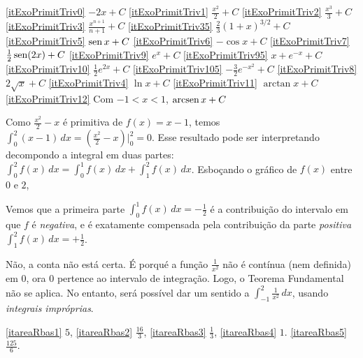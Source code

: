 \begin{Solution}{9.6}
\eqref{itExoPrimitTriv0} $-2x+C$
\eqref{itExoPrimitTriv1} $\frac{x^2}{2}+C$
\eqref{itExoPrimitTriv2} $\frac{x^3}{3}+C$
\eqref{itExoPrimitTriv3} $\frac{x^{n+1}}{n+1}+C$
\eqref{itExoPrimitTriv35} $\tfrac{2}{3}(1+x)^{3/2}+C$
\eqref{itExoPrimitTriv5} $\operatorname{sen} x+C$
\eqref{itExoPrimitTriv6} $-\cos x+C$
\eqref{itExoPrimitTriv7} $\frac{1}{2}\operatorname{sen} (2x)+C$
\eqref{itExoPrimitTriv9} $e^x+C$
\eqref{itExoPrimitTriv95} $x+e^{-x}+C$
\eqref{itExoPrimitTriv10} $\tfrac12 e^{2x}+C$
\eqref{itExoPrimitTriv105} $-\tfrac32e^{-x^2}+C$
\eqref{itExoPrimitTriv8} $2\sqrt{x}+C$
\eqref{itExoPrimitTriv4} $\ln x+C$
\eqref{itExoPrimitTriv11} $\arctan x+C$
\eqref{itExoPrimitTriv12} Com $-1<x<1$, $\operatorname{arcsen} x+C$
\end{Solution}
\begin{Solution}{9.8}
Como $\tfrac{x^2}{2}-x$ é primitiva de $f(x)=x-1$, temos
$\int_0^2(x-1)\,dx=(\tfrac{x^2}{2}-x)|_0^2=0$.
Esse resultado pode ser interpretando decompondo a integral em duas partes:
$\int_0^2f(x)\,dx=\int_0^1f(x)\,dx+\int_1^2f(x)\,dx$.
Esboçando o gráfico de $f(x)$ entre $0$ e $2$,
\begin{center}
\begin{bmlimage}\end{bmlimage}
\end{center}
Vemos que a primeira parte
$\int_0^1f(x)\,dx=-\tfrac12$ é a contribuição do intervalo em
que $f$ é \emph{negativa}, e é exatamente
compensada pela contribuição da parte \emph{positiva}
$\int_1^2f(x)\,dx=+\tfrac12$.
\end{Solution}
\begin{Solution}{9.9}
Não, a conta não está certa. É porqué a função $\frac{1}{x^2}$ não é
contínua (nem definida) em $0$, ora $0$ pertence ao intervalo de
integração. Logo, o Teorema Fundamental não se aplica.
No entanto, será possível dar um sentido a
$\int_{-1}^2\frac{1}{x^2}\,dx$, usando \emph{integrais impróprias}.
\end{Solution}
\begin{Solution}{9.10}
\eqref{itareaRbas1} $5$,
\eqref{itareaRbas2} $\frac{16}{3}$,
\eqref{itareaRbas3} $\frac{1}{3}$,
\eqref{itareaRbas4} $1$.
\eqref{itareaRbas5} $\tfrac{125}{6}$.
\end{Solution}
